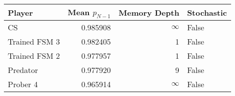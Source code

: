 \begin{tabular}{lrrl}
\toprule
        Player &  Mean $p_{N-1}$ &  Memory Depth & Stochastic \\
\midrule
            CS &        0.985908 &            \(\infty\) &      False \\
 Trained FSM 3 &        0.982405 &             1 &      False \\
 Trained FSM 2 &        0.977957 &             1 &      False \\
      Predator &        0.977920 &             9 &      False \\
      Prober 4 &        0.965914 &            \(\infty\) &      False \\
\bottomrule
\end{tabular}
